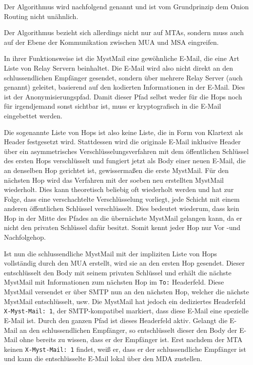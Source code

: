 Der Algorithmus wird nachfolgend  genannt und ist vom Grundprinzip dem Onion Routing  nicht unähnlich.

Der Algorithmus bezieht sich allerdings nicht nur auf MTAs, sondern muss auch auf der Ebene der Kommunikation zwischen MUA und MSA eingreifen.

In ihrer Funktionsweise ist die MystMail eine gewöhnliche E-Mail, die eine Art Liste von Relay Servern beinhaltet. Die E-Mail wird also nicht direkt an den schlussendlichen Empfänger gesendet, sondern über mehrere Relay Server (auch  genannt) geleitet, basierend auf den kodierten Informationen in der E-Mail. Dies ist der Anonymisierungspfad. Damit dieser Pfad selbst weder für die Hops noch für irgendjemand sonst sichtbar ist, muss er kryptografisch in die E-Mail eingebettet werden.

Die sogenannte Liste von Hops ist also keine Liste, die in Form von Klartext als Header festgesetzt wird. Stattdessen wird die originale E-Mail inklusive Header über ein asymmetrisches Verschlüsselungsverfahren mit dem öffentlichen Schlüssel des ersten Hops verschlüsselt und fungiert jetzt als Body einer neuen E-Mail, die an denselben Hop gerichtet ist, gewissermaßen die erste MystMail. Für den nächsten Hop wird das Verfahren mit der soeben neu erstellten MystMail wiederholt. Dies kann theoretisch beliebig oft wiederholt werden und hat zur Folge, dass eine verschachtelte Verschlüsselung vorliegt, jede Schicht mit einem anderen öffentlichen Schlüssel verschlüsselt. Dies bedeutet wiederum, dass kein Hop in der Mitte des Pfades an die übernächste MystMail gelangen kann, da er nicht den privaten Schlüssel dafür besitzt. Somit kennt jeder Hop nur Vor -und Nachfolgehop.

Ist nun die schlussendliche MystMail mit der impliziten Liste von Hops vollständig durch den MUA erstellt, wird sie an den ersten Hop gesendet. Dieser entschlüsselt den Body mit seinem privaten Schlüssel und erhält die nächste MystMail mit Informationen zum nächsten Hop im \verb#To:# Headerfeld. Diese MystMail versendet er über SMTP nun an den nächsten Hop, welcher die nächste MystMail entschlüsselt, usw. Die MystMail hat jedoch ein dediziertes Headerfeld \verb#X-Myst-Mail: 1#, der SMTP-kompatibel markiert, dass diese E-Mail eine spezielle E-Mail ist. Durch den ganzen Pfad ist dieses Headerfeld aktiv. Gelangt die E-Mail an den schlussendlichen Empfänger, so entschlüsselt dieser den Body der E-Mail ohne bereits zu wissen, dass er der Empfänger ist. Erst nachdem der MTA keinen \verb#X-Myst-Mail: 1# findet, weiß er, dass er der schlussendliche Empfänger ist und kann die entschlüsselte E-Mail lokal über den MDA zustellen.

